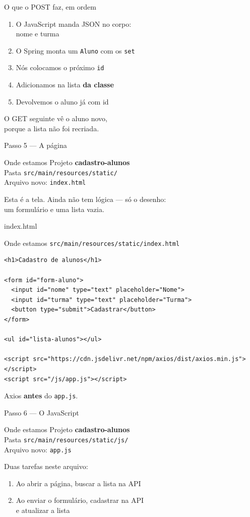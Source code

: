 \documentclass[aspectratio=169,11pt]{beamer}
\newcommand{\onde}[1]{%
  \begin{block}{Onde estamos}
    #1
  \end{block}
}
\begin{document}
\begin{frame}{O que o POST faz, em ordem}
  \begin{enumerate}
    \item O JavaScript manda JSON no corpo:\\
          nome e turma
    \item O Spring monta um \texttt{Aluno} com os \texttt{set}
    \item Nós colocamos o próximo \texttt{id}
    \item Adicionamos na lista \textbf{da classe}
    \item Devolvemos o aluno já com id
  \end{enumerate}

  \vspace{0.5em}
  O GET seguinte vê o aluno novo,\\
  porque a lista não foi recriada.
\end{frame}

\begin{frame}[fragile]{Passo 5 --- A página}
  \onde{Projeto \textbf{cadastro-alunos}\\
        Pasta \texttt{src/main/resources/static/}\\
        Arquivo novo: \texttt{index.html}}

  Esta é a tela. Ainda não tem lógica --- só o desenho:\\
  um formulário e uma lista vazia.
\end{frame}

\begin{frame}[fragile]{index.html}
  \onde{\texttt{src/main/resources/static/index.html}}

\begin{lstlisting}[basicstyle=\ttfamily\footnotesize]
<h1>Cadastro de alunos</h1>

<form id="form-aluno">
  <input id="nome" type="text" placeholder="Nome">
  <input id="turma" type="text" placeholder="Turma">
  <button type="submit">Cadastrar</button>
</form>

<ul id="lista-alunos"></ul>

<script src="https://cdn.jsdelivr.net/npm/axios/dist/axios.min.js"></script>
<script src="/js/app.js"></script>
\end{lstlisting}

  Axios \textbf{antes} do \texttt{app.js}.
\end{frame}

\begin{frame}{Passo 6 --- O JavaScript}
  \onde{Projeto \textbf{cadastro-alunos}\\
        Pasta \texttt{src/main/resources/static/js/}\\
        Arquivo novo: \texttt{app.js}}

  Duas tarefas neste arquivo:
  \begin{enumerate}
    \item Ao abrir a página, buscar a lista na API
    \item Ao enviar o formulário, cadastrar na API\\
          e atualizar a lista
  \end{enumerate}
\end{frame}
\end{document}
